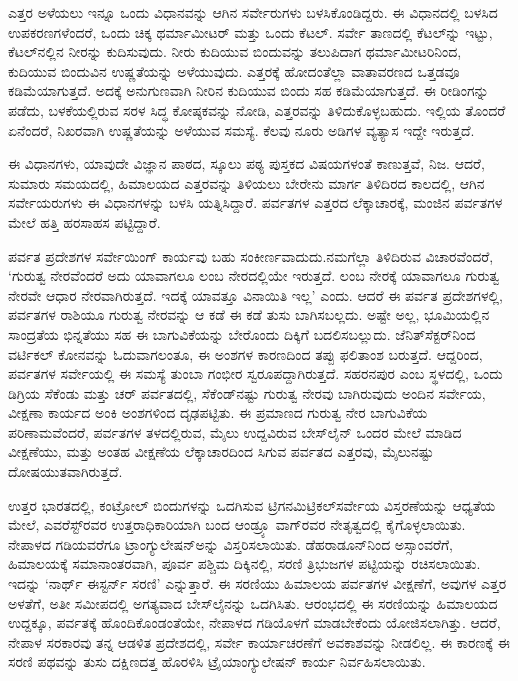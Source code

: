 ಎತ್ತರ ಅಳೆಯಲು ಇನ್ನೂ ಒಂದು ವಿಧಾನವನ್ನು ಆಗಿನ ಸರ್ವೇರುಗಳು ಬಳಸಿಕೊಂಡಿ\-ದ್ದರು. ಈ ವಿಧಾನದಲ್ಲಿ ಬಳಸಿದ ಉಪಕರಣಗಳೆಂದರೆ, ಒಂದು ಚಿಕ್ಕ ಥರ್ಮಾಮೀಟರ್​ ಮತ್ತು ಒಂದು ಕೆಟಲ್​. ಸರ್ವೇ ತಾಣದಲ್ಲಿ ಕೆಟಲ್​ನ್ನು ಇಟ್ಟು, ಕೆಟಲ್​ನಲ್ಲಿನ ನೀರನ್ನು ಕುದಿಸುವುದು. ನೀರು ಕುದಿಯುವ ಬಿಂದುವನ್ನು ತಲುಪಿದಾಗ ಥರ್ಮಾಮೀಟರಿನಿಂದ, ಕುದಿಯುವ ಬಿಂದುವಿನ ಉಷ್ಣತೆಯನ್ನು ಅಳೆಯುವುದು. ಎತ್ತರಕ್ಕೆ ಹೋದಂತೆಲ್ಲಾ ವಾತಾವರಣದ ಒತ್ತಡವೂ ಕಡಿಮೆಯಾಗುತ್ತದೆ. ಅದಕ್ಕೆ ಅನುಗುಣವಾಗಿ ನೀರಿನ ಕುದಿಯುವ ಬಿಂದು ಸಹ ಕಡಿಮೆಯಾಗುತ್ತದೆ. ಈ ರೀಡಿಂಗನ್ನು ಪಡೆದು, ಬಳಕೆಯಲ್ಲಿರುವ ಸರಳ ಸಿದ್ಧ ಕೋಷ್ಠಕವನ್ನು ನೋಡಿ, ಎತ್ತರವನ್ನು ತಿಳಿದುಕೊಳ್ಳಬಹುದು. ಇಲ್ಲಿಯ ತೊಂದರೆ ಏನೆಂದರೆ, ನಿಖರವಾಗಿ ಉಷ್ಣತೆಯನ್ನು ಅಳೆಯುವ ಸಮಸ್ಯೆ. ಕೆಲವು ನೂರು ಅಡಿಗಳ ವ್ಯತ್ಯಾಸ ಇದ್ದೇ ಇರುತ್ತದೆ.

ಈ ವಿಧಾನಗಳು, ಯಾವುದೇ ವಿಜ್ಞಾನ ಪಾಠದ, ಸ್ಕೂಲು ಪಠ್ಯ ಪುಸ್ತಕದ ವಿಷಯಗಳಂತೆ ಕಾಣುತ್ತವೆ, ನಿಜ. ಆದರೆ, ಸುಮಾರು  ಸಮಯದಲ್ಲಿ, ಹಿಮಾಲಯದ ಎತ್ತರವನ್ನು ತಿಳಿಯಲು ಬೇರೇನು ಮಾರ್ಗ ತಿಳಿದಿರದ ಕಾಲದಲ್ಲಿ, ಆಗಿನ ಸರ್ವೇಯರುಗಳು ಈ ವಿಧಾನಗಳನ್ನು ಬಳಸಿ ಯತ್ನಿಸಿದ್ದಾರೆ. ಪರ್ವತಗಳ ಎತ್ತರದ ಲೆಕ್ಕಾಚಾರಕ್ಕೆ, ಮಂಜಿನ ಪರ್ವತಗಳ ಮೇಲೆ ಹತ್ತಿ ಹರಸಾಹಸ ಪಟ್ಟಿದ್ದಾರೆ.

ಪರ್ವತ ಪ್ರದೇಶಗಳ ಸರ್ವೇಯಿಂಗ್​ ಕಾರ್ಯವು ಬಹು ಸಂಕೀರ್ಣವಾದುದು.\break ನಮಗೆಲ್ಲಾ ತಿಳಿದಿರುವ ವಿಚಾರವೆಂದರೆ, ‘ಗುರುತ್ವ ನೇರವೆಂದರೆ ಅದು ಯಾವಾಗಲೂ ಲಂಬ ನೇರದಲ್ಲಿಯೇ ಇರುತ್ತದೆ. ಲಂಬ ನೇರಕ್ಕೆ ಯಾವಾಗಲೂ ಗುರುತ್ವ ನೇರವೇ ಆಧಾರ ನೇರವಾಗಿರುತ್ತದೆ. ಇದಕ್ಕೆ ಯಾವತ್ತೂ ವಿನಾಯಿತಿ ಇಲ್ಲ’ ಎಂದು. ಆದರೆ ಈ ಪರ್ವತ ಪ್ರದೇಶಗಳಲ್ಲಿ, ಪರ್ವತಗಳ ರಾಶಿಯೂ ಗುರುತ್ವ ನೇರವನ್ನು ಆ ಕಡೆ ಈ ಕಡೆ ತುಸು ಬಾಗಿಸಬಲ್ಲದು. ಅಷ್ಟೇ ಅಲ್ಲ, ಭೂಮಿಯಲ್ಲಿನ ಸಾಂದ್ರತೆಯ ಭಿನ್ನತೆಯು ಸಹ ಈ ಬಾಗುವಿಕೆಯನ್ನು ಬೇರೊಂದು ದಿಕ್ಕಿಗೆ ಬದಲಿಸಬಲ್ಲುದು. ಜೆನಿತ್​ ಸೆಕ್ಟರ್​ನಿಂದ ವರ್ಟಿಕಲ್​ ಕೋನವನ್ನು ಓದುವಾಗಲಂತೂ, ಈ ಅಂಶಗಳ ಕಾರಣದಿಂದ ತಪ್ಪು ಫಲಿತಾಂಶ ಬರುತ್ತದೆ. ಆದ್ದರಿಂದ, ಪರ್ವತಗಳ ಸರ್ವೇಯಲ್ಲಿ ಈ ಸಮಸ್ಯೆ ತುಂಬಾ ಗಂಭೀರ ಸ್ವರೂಪದ್ದಾಗಿರುತ್ತದೆ. ಸಹರನಪುರ ಎಂಬ ಸ್ಥಳದಲ್ಲಿ, ಒಂದು ಡಿಗ್ರಿಯ  ಸೆಕೆಂಡು ಮತ್ತು ಚರ್​ ಪರ್ವತದಲ್ಲಿ,  ಸೆಕೆಂಡ್​ನಷ್ಟು ಗುರುತ್ವ ನೇರವು ಬಾಗಿರುವುದು ಅಂದಿನ ಸರ್ವೇಯ, ವೀಕ್ಷಣಾ ಕಾರ್ಯದ ಅಂಕಿ ಅಂಶಗಳಿಂದ ದೃಢಪಟ್ಟಿತು. ಈ ಪ್ರಮಾಣದ ಗುರುತ್ವ ನೇರ ಬಾಗುವಿಕೆಯ ಪರಿಣಾಮವೆಂದರೆ, ಪರ್ವತಗಳ ತಳದಲ್ಲಿರುವ,  ಮೈಲು ಉದ್ದವಿರುವ ಬೇಸ್​ಲೈನ್​ ಒಂದರ ಮೇಲೆ ಮಾಡಿದ ವೀಕ್ಷಣೆಯು, ಮತ್ತು ಅಂತಹ ವೀಕ್ಷಣೆಯ ಲೆಕ್ಕಾಚಾರದಿಂದ ಸಿಗುವ ಪರ್ವತದ ಎತ್ತರವು,  ಮೈಲುನಷ್ಟು ದೋಷಯುತವಾಗಿರುತ್ತದೆ.

ಉತ್ತರ ಭಾರತದಲ್ಲಿ, ಕಂಟ್ರೋಲ್​ ಬಿಂದುಗಳನ್ನು ಒದಗಿಸುವ ಟ್ರಿಗನಮಿಟ್ರಿಕಲ್​\break ಸರ್ವೇಯ ವಿಸ್ತರಣೆಯನ್ನು ಆಧ್ಯತೆಯ ಮೇಲೆ, ಎವರೆಸ್ಟ್​ರವರ ಉತ್ತರಾಧಿಕಾರಿಯಾಗಿ ಬಂದ ಆಂಡ್ರ್ಯೂ ವಾಗ್​ರವರ ನೇತೃತ್ವದಲ್ಲಿ ಕೈಗೊಳ್ಳಲಾಯಿತು. ನೇಪಾಳದ ಗಡಿಯವರೆಗೂ ಟ್ರಾಂಗ್ಯುಲೇಷನ್​ಅನ್ನು ವಿಸ್ತರಿಸಲಾಯಿತು. ಡೆಹರಾಡೂನ್​ನಿಂದ ಅಸ್ಸಾಂವರೆಗೆ, ಹಿಮಾಲಯಕ್ಕೆ ಸಮಾನಾಂತರವಾಗಿ, ಪೂರ್ವ ಪಶ್ಚಿಮ ದಿಕ್ಕಿನಲ್ಲಿ, ಸರಣಿ ತ್ರಿಭುಜಗಳ ಪಟ್ಟಿಯನ್ನು ರಚಿಸಲಾಯಿತು. ಇದನ್ನು ‘ನಾರ್ಥ್ ಈಸ್ಟರ್ನ್ ಸರಣಿ’ ಎನ್ನುತ್ತಾರೆ. ಈ ಸರಣಿಯು ಹಿಮಾಲಯ ಪರ್ವತಗಳ ವೀಕ್ಷಣೆಗೆ, ಅವುಗಳ ಎತ್ತರ ಅಳತೆಗೆ, ಅತೀ ಸಮೀಪದಲ್ಲಿ ಅಗತ್ಯವಾದ ಬೇಸ್‌ಲೈನನ್ನು ಒದಗಿಸಿತು. ಆರಂಭದಲ್ಲಿ ಈ ಸರಣಿಯನ್ನು ಹಿಮಾಲಯದ ಉದ್ದಕ್ಕೂ, ಪರ್ವತಕ್ಕೆ ಹೊಂದಿಕೊಂಡಂತೆಯೇ, ನೇಪಾಳದ ಗಡಿಯೊಳಗೆ ಮಾಡಬೇಕೆಂದು ಯೋಜಿಸಲಾಗಿತ್ತು. ಆದರೆ, ನೇಪಾಳ ಸರಕಾರವು ತನ್ನ ಆಡಳಿತ ಪ್ರದೇಶದಲ್ಲಿ, ಸರ್ವೇ ಕಾರ್ಯಾಚರಣೆಗೆ ಅವಕಾಶವನ್ನು ನೀಡಲಿಲ್ಲ. ಈ ಕಾರಣಕ್ಕೆ ಈ ಸರಣಿ ಪಥವನ್ನು ತುಸು ದಕ್ಷಿಣದತ್ತ ಹೊರಳಿಸಿ ಟ್ರೈಯಾಂಗ್ಯುಲೇಷನ್​ ಕಾರ್ಯ ನಿರ್ವಹಿಸಲಾಯಿತು.

